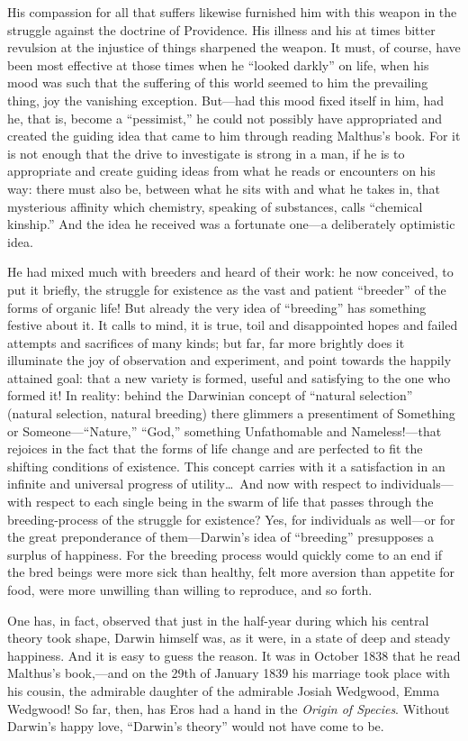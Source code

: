 \documentclass[12pt,a4paper]{article}
\begin{document}
His compassion for all that suffers likewise furnished him with
this weapon in the struggle against the doctrine of Providence.
His illness and his at times bitter revulsion at the injustice
of things sharpened the weapon. It must, of course, have been
most effective at those times when he ``looked darkly'' on life,
when his mood was such that the suffering of this world seemed
to him the prevailing thing, joy the vanishing exception.
But---had this mood fixed itself in him, had he, that is,
become a ``pessimist,'' he could not possibly have appropriated
and created the guiding idea that came to him through reading
Malthus's book. For it is not enough that the drive to
investigate is strong in a man, if he is to appropriate and
create guiding ideas from what he reads or encounters on his
way: there must also be, between what he sits with and what he
takes in, that mysterious affinity which chemistry, speaking of
substances, calls ``chemical kinship.'' And the idea he received
was a fortunate one---a deliberately optimistic idea.

He had mixed much with breeders and heard of their work: he
now conceived, to put it briefly, the struggle for existence as
the vast and patient ``breeder'' of the forms of organic life!
But already the very idea of ``breeding'' has something
festive about it. It calls to mind, it is true, toil and
disappointed hopes and failed attempts and sacrifices of many
kinds; but far, far more brightly does it illuminate the joy of
observation and experiment, and point towards the happily
attained goal: that a new variety is formed, useful and
satisfying to the one who formed it! In reality: behind the
Darwinian concept of ``natural selection'' (natural selection,
natural breeding) there glimmers a presentiment of Something or
Someone---``Nature,'' ``God,'' something Unfathomable and
Nameless!---that rejoices in the fact that the forms of life
change and are perfected to fit the shifting conditions of
existence. This concept carries with it a satisfaction in an
infinite and universal progress of utility\ldots\ And now with
respect to individuals---with respect to each single being in
the swarm of life that passes through the breeding-process of
the struggle for existence? Yes, for individuals as well---or
for the great preponderance of them---Darwin's idea of
``breeding'' presupposes a surplus of happiness. For the
breeding process would quickly come to an end if the bred
beings were more sick than healthy, felt more aversion than
appetite for food, were more unwilling than willing to
reproduce, and so forth.

One has, in fact, observed that just in the half-year during
which his central theory took shape, Darwin himself was, as it
were, in a state of deep and steady happiness. And it is easy to
guess the reason. It was in October 1838 that he read Malthus's
book,---and on the 29th of January 1839 his marriage took place
with his cousin, the admirable daughter of the admirable Josiah
Wedgwood, Emma Wedgwood! So far, then, has Eros had a hand in
the \emph{Origin of Species}. Without Darwin's happy love,
``Darwin's theory'' would not have come to be.
\end{document}
